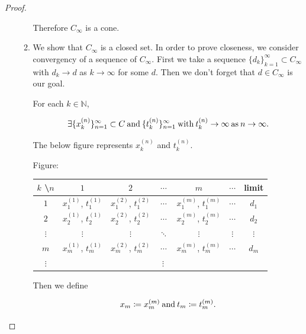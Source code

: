 \documentclass[a4paper,11pt]{jsarticle}
\newcommand{\NaturalNumberSet}{\mathbb{N}}
\begin{document}
\begin{proof}
\begin{enumerate}[label=\roman*,align=CenterWithParen]
\begin{enumerate}[label=i-\alph*,align=CenterWithParen]
        Therefore $C_{\infty}$ is a cone.

        \item We show that $C_{\infty}$ is a closed set. In order to prove closeness, we consider convergency of a sequence of $C_{\infty}$. First we take a sequence $\{d_k\}_{k=1}^{\infty} \subset C_{\infty}$ with $d_k \rightarrow d$ as $k \rightarrow \infty$ for some $d$. Then we don't forget that $d \in C_{\infty}$ is our goal.

        For each $k \in \NaturalNumberSet$,

        \begin{equation}
          \exists \{x_k^{(n)}\}_{n=1}^{\infty} \subset C \:\text{and}\: \{t_k^{(n)}\}_{n=1}^{\infty} \:\text{with}\: t_k^{(n)} \rightarrow \infty \:\text{as}\: n \rightarrow \infty. \notag
        \end{equation}

        The below figure represents $x_k^{(n)}$ and $t_k^{(n)}$.
        \medskip

        Figure:

        \medskip

        \begin{center}
          \large
          \begin{tabular}{|c|c|c|c|c|c|c|} \hline
            $k$ \textbackslash $n$ & $1$ & $2$ & $\cdots$ & $m$ & $\cdots$ & limit \\ \hline
            $1$ & $x_1^{(1)}$, $t_1^{(1)}$ & $x_1^{(2)}$, $t_1^{(2)}$ & $\cdots$ & $x_1^{(m)}$, $t_1^{(m)}$ & $\cdots$ & $d_{1}$ \\
            $2$ & $x_2^{(1)}$, $t_2^{(1)}$ & $x_2^{(2)}$, $t_2^{(2)}$ & $\cdots$ & $x_2^{(m)}$, $t_2^{(m)}$ & $\cdots$ & $d_{2}$ \\
            $\vdots$ & $\vdots$ & $\vdots$ & $\ddots$ & $\vdots$ & $\vdots$ & $\vdots$ \\
            $m$ & $x_m^{(1)}$, $t_m^{(1)}$ & $x_m^{(2)}$, $t_m^{(2)}$ & $\cdots$ & $x_m^{(m)}$, $t_m^{(m)}$ & $\cdots$ & $d_{m}$ \\
            $\vdots$ & \multicolumn{6}{|c|}{$\vdots$} \\ \hline
          \end{tabular}
        \end{center}

        \medskip

        Then we define

        \begin{equation}
          x_m \coloneqq x_m^{(m)} \:\text{and}\: t_m \coloneqq t_m^{(m)}. \notag
        \end{equation}


\end{enumerate}
\end{enumerate}
\end{proof}
\end{document}
